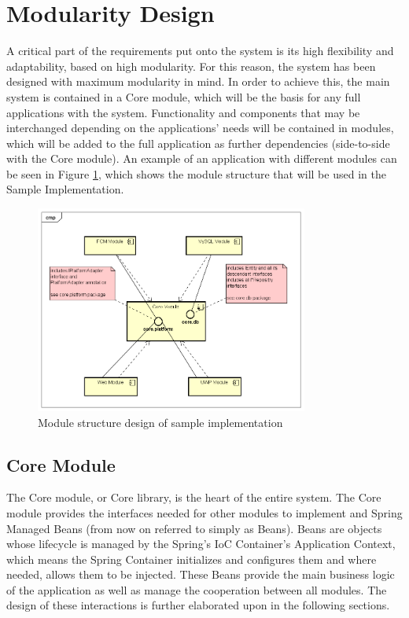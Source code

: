 \section{Modularity Design}

A critical part of the requirements put onto the system is its high flexibility and adaptability, based on high modularity. For this reason, the system has been designed with maximum modularity in mind. In order to achieve this, the main system is contained in a Core module, which will be the basis for any full applications with the system. Functionality and components that may be interchanged depending on the applications' needs will be contained in modules, which will be added to the full application as further dependencies (side-to-side with the Core module). An example of an application with different modules can be seen in Figure \ref{fig:s-impl-comps}, which shows the module structure that will be used in the Sample Implementation.

\begin{figure}[H]
	\centering
	\includegraphics[width=0.8\textwidth]{figures/03_design/s-impl-comps}
    \caption{Module structure design of sample implementation}
    \label{fig:s-impl-comps}
\end{figure}

\subsection{Core Module}
The Core module, or Core library, is the heart of the entire system. The Core module provides the interfaces needed for other modules to implement and Spring Managed Beans (from now on referred to simply as Beans). Beans are objects whose lifecycle is managed by the Spring's IoC Container's Application Context, which means the Spring Container initializes and configures them and where needed, allows them to be injected\cite{spring-beans}. These Beans provide the main business logic of the application as well as manage the cooperation between all modules. The design of these interactions is further elaborated upon in the following sections.

